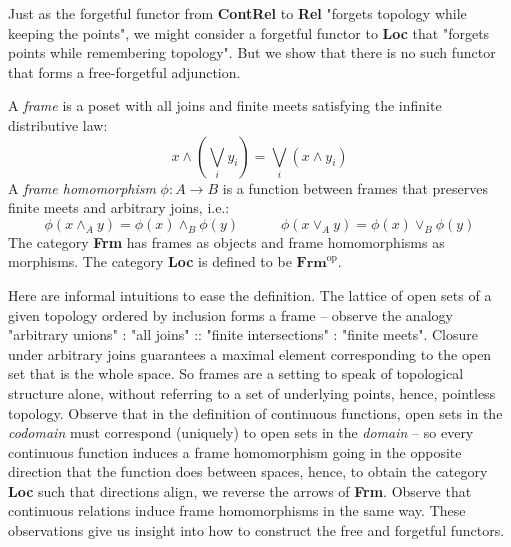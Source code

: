 \begin{fullwidth}

Just as the forgetful functor from \textbf{ContRel} to \textbf{Rel} "forgets topology while keeping the points", we might consider a forgetful functor to \textbf{Loc} that "forgets points while remembering topology". But we show that there is no such functor that forms a free-forgetful adjunction.

\begin{rem}
A \emph{frame} is a poset with all joins and finite meets satisfying the infinite distributive law:
\[x \wedge (\bigvee\limits_{i}y_i) = \bigvee\limits_{i}(x \wedge y_i)\]
A \emph{frame homomorphism} $\phi: A \rightarrow B$ is a function between frames that preserves finite meets and arbitrary joins, i.e.:
\[\phi(x \wedge_A y) = \phi(x) \wedge_B \phi(y) \quad \quad \quad \phi(x \vee_A y) = \phi(x) \vee_B \phi(y)\]
The category \textbf{Frm} has frames as objects and frame homomorphisms as morphisms. The category \textbf{Loc} is defined to be $\textbf{Frm}^\text{op}$.
\end{rem}

\begin{remark}
Here are informal intuitions to ease the definition. The lattice of open sets of a given topology ordered by inclusion forms a frame -- observe the analogy "arbitrary unions" : "all joins" :: "finite intersections" : "finite meets". Closure under arbitrary joins guarantees a maximal element corresponding to the open set that is the whole space. So frames are a setting to speak of topological structure alone, without referring to a set of underlying points, hence, pointless topology. Observe that in the definition of continuous functions, open sets in the \emph{codomain} must correspond (uniquely) to open sets in the \emph{domain} -- so every continuous function induces a frame homomorphism going in the opposite direction that the function does between spaces, hence, to obtain the category \textbf{Loc} such that directions align, we reverse the arrows of \textbf{Frm}. Observe that continuous relations induce frame homomorphisms in the same way. These observations give us insight into how to construct the free and forgetful functors.
\end{remark}


\end{fullwidth}
